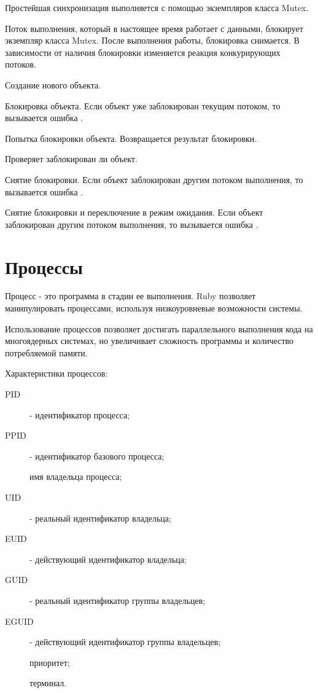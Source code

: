 Простейшая синхронизация выполняется с помощью экземпляров класса Mutex.

Поток выполнения, который в настоящее время работает с данными, блокирует экземпляр класса Mutex. После выполнения работы, блокировка снимается. В зависимости от наличия блокировки изменяется реакция конкурирующих потоков.

\begin{methodlist}
  Создание нового объекта. 

  Блокировка объекта. Если объект уже заблокирован текущим потоком, то вызывается ошибка . 

  Попытка блокировки объекта. Возвращается результат блокировки.

  Проверяет заблокирован ли объект. 

  Снятие блокировки. Если объект заблокирован другим потоком выполнения, то вызывается ошибка .

  Снятие блокировки и переключение в режим ожидания. Если объект заблокирован другим потоком выполнения, то вызывается ошибка . 
\end{methodlist}

\section{Процессы}

Процесс - это программа в стадии ее выполнения. Ruby позволяет манипулировать процессами, используя низкоуровневые возможности системы.

Использование процессов позволяет достигать параллельного выполнения кода на многоядерных системах, но увеличивает сложность программы и количество потребляемой памяти. 

Характеристики процессов:
\begin{description}
  \item[PID] - идентификатор процесса;
  \item[PPID] - идентификатор базового процесса;
  \item[]имя владельца процесса;
  \item[UID] - реальный идентификатор владельца;
  \item[EUID] - действующий идентификатор владельца;
  \item[GUID] - реальный идентификатор группы владельцев;
  \item[EGUID] - действующий идентификатор группы владельцев;
  \item[]приоритет;
  \item[]терминал.
\end{description}

